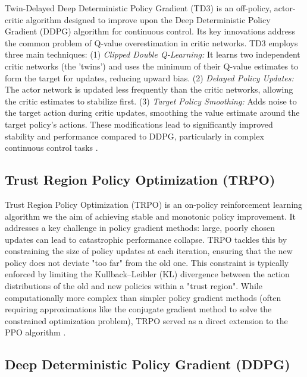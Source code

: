 \documentclass[12pt, a4paper]{article} %
\begin{document}
Twin-Delayed Deep Deterministic Policy Gradient (TD3) \citep{fujimoto2018addressing} is an off-policy, actor-critic algorithm designed to improve upon the Deep Deterministic Policy Gradient (DDPG) algorithm for continuous control. Its key innovations address the common problem of Q-value overestimation in critic networks. TD3 employs three main techniques:
(1) \textit{Clipped Double Q-Learning:} It learns two independent critic networks (the 'twins') and uses the minimum of their Q-value estimates to form the target for updates, reducing upward bias.
(2) \textit{Delayed Policy Updates:} The actor network is updated less frequently than the critic networks, allowing the critic estimates to stabilize first.
(3) \textit{Target Policy Smoothing:} Adds noise to the target action during critic updates, smoothing the value estimate around the target policy's actions.
These modifications lead to significantly improved stability and performance compared to DDPG, particularly in complex continuous control tasks \citep[e.g.,][]{jia2023robust}.

\subsection{Trust Region Policy Optimization (TRPO)}
\label{def:trpo} %

Trust Region Policy Optimization (TRPO) \citep{schulman2015trust} is an on-policy reinforcement learning algorithm we the aim of achieving stable and monotonic policy improvement. It addresses a key challenge in policy gradient methods: large, poorly chosen updates can lead to catastrophic performance collapse. TRPO tackles this by constraining the size of policy updates at each iteration, ensuring that the new policy does not deviate "too far" from the old one. This constraint is typically enforced by limiting the Kullback–Leibler (KL) divergence between the action distributions of the old and new policies within a "trust region". While computationally more complex than simpler policy gradient methods (often requiring approximations like the conjugate gradient method to solve the constrained optimization problem), TRPO served as a direct extension to the PPO algorithm \citep{pinto2017robust, rajeswaran2016epopt}.
\subsection{Deep Deterministic Policy Gradient (DDPG)}
\label{def:ddpg} %
\end{document}
